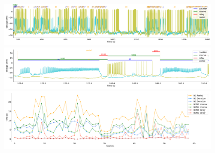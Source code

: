 \begin{figure}[htbp]
	\centering
	\begin{minipage}[b]{\textwidth}
		\centering
		\includegraphics[width=\textwidth,height=0.1\textheight]{./invariants/data/SUSSEX/prep3/images/prep3_3phases_signal_intervals_zoom.pdf}
		\includegraphics[width=\textwidth]{./invariants/data/SUSSEX/prep3/images/prep3_signal_intervals_cycle.pdf}
		\includegraphics[width=\textwidth]{./invariants/data/SUSSEX/prep3/images/prep3_time_cycle.pdf}
	\end{minipage}
	\centering
	\begin{minipage}[b]{0.45\textwidth}
		\centering

\end{minipage}
\end{figure}
